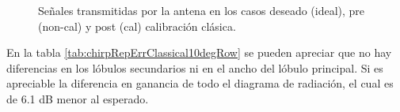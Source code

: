 \begin{figure}[H]
	\centering

	\caption{Señales transmitidas por la antena en los casos deseado (ideal), pre (non-cal) y post (cal) calibración clásica.}
	\label{fig:chirpRepErrClassical10degRow}
\end{figure}

En la tabla \ref{tab:chirpRepErrClassical10degRow} se pueden apreciar que no hay diferencias en los lóbulos secundarios ni en el
ancho del lóbulo principal. Si es apreciable la diferencia en ganancia de todo el diagrama de radiación, el cual es de 6.1 dB
menor al esperado.

